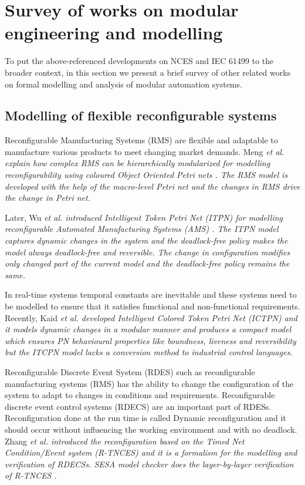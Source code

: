 \documentclass[runningheads]{llncs}
\newcommand{\etal}{\it et al. \normalfont}
\begin{document}
\section{Survey of works on modular engineering and modelling}\label{sec:survey}

To put the above-referenced developments on NCES and IEC 61499 to the broader context, in this section we present a brief survey of other related works on formal modelling and analysis of modular automation systems. 

\subsection{Modelling of flexible reconfigurable systems}

Reconfigurable Manufacturing Systems (RMS) are flexible and adaptable to manufacture various products to meet changing market demands. Meng \etal explain how complex RMS can be hierarchically modularized for modelling reconfigurability using coloured Object Oriented Petri nets \cite{MENG201081}. The  RMS model is developed with the help of the macro-level Petri net and the changes in RMS drive the change in Petri net.

Later,  Wu \etal introduced Intelligent Token Petri Net (ITPN) for modelling reconfigurable Automated Manufacturing Systems (AMS) \cite{wu2011intelligent}. The ITPN model captures dynamic changes in the system and the deadlock-free policy makes the model always deadlock-free and reversible. The change in configuration modifies only changed part of the current model and the deadlock-free policy remains the same.

In real-time systems temporal constants are inevitable and these systems need to be modelled to ensure that it satisfies functional and non-functional requirements. Recently, Kaid \etal developed  Intelligent Colored Token Petri Net (ICTPN) and it models dynamic changes in a modular manner and produces a compact model which ensures PN behavioural properties like boundness, liveness and reversibility but the ITCPN model lacks a conversion method to industrial control languages.

Reconfigurable Discrete Event System (RDES) such as reconfigurable manufacturing systems (RMS) has the ability to change the configuration of the system to adapt to changes in conditions and requirements.
Reconfigurable discrete event control systems  (RDECS) are an important part of RDESs.  Reconfiguration done at the run time is called Dynamic reconfiguration and it should occur without influencing the working environment and with no deadlock. Zhang \etal introduced the reconfiguration based on the Timed Net Condition/Event system (R-TNCES) and it is a formalism for the modelling and verification of RDECSs. SESA model checker does the layer-by-layer verification of R-TNCES \cite{zhang2013r}.  
\end{document}
